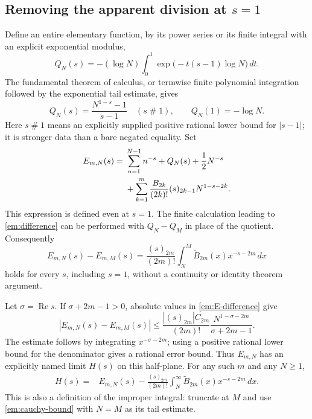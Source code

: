 \subsection{Removing the apparent division at $s=1$}

Define an entire elementary function, by its power series or its finite
integral with an explicit exponential modulus,
\begin{equation}
 Q_N(s)=-(\log N)\int_0^1
                \exp\bigl(-t(s-1)\log N\bigr)\,dt.
 \label{em:Q}
\end{equation}
The fundamental theorem of calculus, or termwise finite polynomial
integration followed by the exponential tail estimate, gives
\[
 Q_N(s)=\frac{N^{1-s}-1}{s-1}\quad(s\mathrel{\#}1),
 \qquad Q_N(1)=-\log N.
\]
Here $s\mathrel{\#}1$ means an explicitly supplied positive rational
lower bound for $|s-1|$; it is stronger data than a bare negated equality.
Set
\begin{align}
 E_{m,N}(s)={}&\sum_{n=1}^{N-1}n^{-s}+Q_N(s)+\frac12N^{-s}\notag\\
 &+\sum_{k=1}^m\frac{B_{2k}}{(2k)!}
                  (s)_{2k-1}N^{1-s-2k}.
 \label{em:E}
\end{align}
This expression is defined even at $s=1$.  The finite calculation leading
to \eqref{em:difference} can be performed with $Q_N-Q_M$ in place of
the quotient.  Consequently
\begin{equation}
 E_{m,N}(s)-E_{m,M}(s)
  =\frac{(s)_{2m}}{(2m)!}
     \int_N^M\widetilde B_{2m}(x)x^{-s-2m}\,dx
 \label{em:E-difference}
\end{equation}
holds for every $s$, including $s=1$, without a continuity or identity
theorem argument.

Let $\sigma=\operatorname{Re}s$.  If $\sigma+2m-1>0$, absolute values
in \eqref{em:E-difference} give
\begin{equation}
 |E_{m,N}(s)-E_{m,M}(s)|
 \leq \frac{|(s)_{2m}|C_{2m}}{(2m)!}
       \frac{N^{1-\sigma-2m}}{\sigma+2m-1}.
 \label{em:cauchy-bound}
\end{equation}
The estimate follows by integrating $x^{-\sigma-2m}$; using a positive
rational lower bound for the denominator gives a rational error bound.
Thus $E_{m,N}$ has an explicitly named limit $H(s)$ on this half-plane.
For any such $m$ and any $N\geq1$,
\begin{align}
 H(s)={}&E_{m,N}(s)
 -\frac{(s)_{2m}}{(2m)!}
       \int_N^\infty\widetilde B_{2m}(x)x^{-s-2m}\,dx.
 \label{em:H-integral}
\end{align}
This is also a definition of the improper integral: truncate at $M$ and
use \eqref{em:cauchy-bound} with $N=M$ as its tail estimate.

